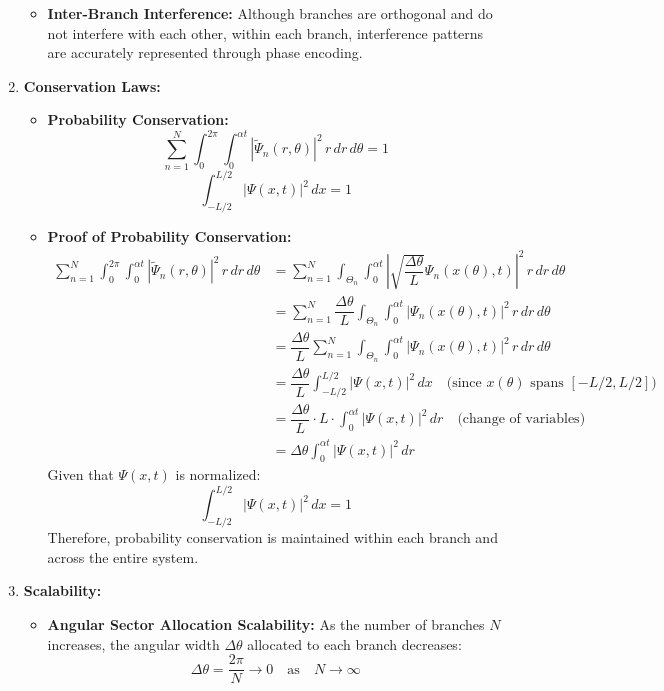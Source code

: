 \documentclass[12pt]{article}
\begin{document}
\begin{enumerate}
\begin{itemize}
        \item \textbf{Inter-Branch Interference:}
        Although branches are orthogonal and do not interfere with each other, within each branch, interference patterns are accurately represented through phase encoding.
    \end{itemize}
    
    \item \textbf{Conservation Laws:}
    \begin{itemize}
        \item \textbf{Probability Conservation:}
        \[
        \sum_{n=1}^{N} \int_{0}^{2\pi} \int_{0}^{\alpha t} |\tilde{\Psi}_n(r,\theta)|^2 \, r \, dr \, d\theta = 1
        \]
        \[
        \int_{-L/2}^{L/2} |\Psi(x,t)|^2 \, dx = 1
        \]
        
        \item \textbf{Proof of Probability Conservation:}
        \begin{align*}
            \sum_{n=1}^{N} \int_{0}^{2\pi} \int_{0}^{\alpha t} |\tilde{\Psi}_n(r,\theta)|^2 \, r \, dr \, d\theta 
            &= \sum_{n=1}^{N} \int_{\Theta_n} \int_{0}^{\alpha t} \left| \sqrt{\dfrac{\Delta\theta}{L}} \Psi_n(x(\theta), t) \right|^2 \, r \, dr \, d\theta \\
            &= \sum_{n=1}^{N} \dfrac{\Delta\theta}{L} \int_{\Theta_n} \int_{0}^{\alpha t} |\Psi_n(x(\theta), t)|^2 \, r \, dr \, d\theta \\
            &= \dfrac{\Delta\theta}{L} \sum_{n=1}^{N} \int_{\Theta_n} \int_{0}^{\alpha t} |\Psi_n(x(\theta), t)|^2 \, r \, dr \, d\theta \\
            &= \dfrac{\Delta\theta}{L} \int_{-L/2}^{L/2} |\Psi(x,t)|^2 \, dx \quad \text{(since } x(\theta) \text{ spans } [-L/2, L/2]) \\
            &= \dfrac{\Delta\theta}{L} \cdot L \cdot \int_{0}^{\alpha t} |\Psi(x,t)|^2 \, dr \quad \text{(change of variables)} \\
            &= \Delta\theta \int_{0}^{\alpha t} |\Psi(x,t)|^2 \, dr
        \end{align*}
        Given that \(\Psi(x,t)\) is normalized:
        \[
        \int_{-L/2}^{L/2} |\Psi(x,t)|^2 \, dx = 1
        \]
        Therefore, probability conservation is maintained within each branch and across the entire system.
    \end{itemize}
    
    \item \textbf{Scalability:}
    \begin{itemize}
        \item \textbf{Angular Sector Allocation Scalability:}
        As the number of branches \(N\) increases, the angular width \(\Delta\theta\) allocated to each branch decreases:
        \[
        \Delta\theta = \dfrac{2\pi}{N} \rightarrow 0 \quad \text{as} \quad N \rightarrow \infty
        \]
        

\end{itemize}
\end{enumerate}
\end{document}
